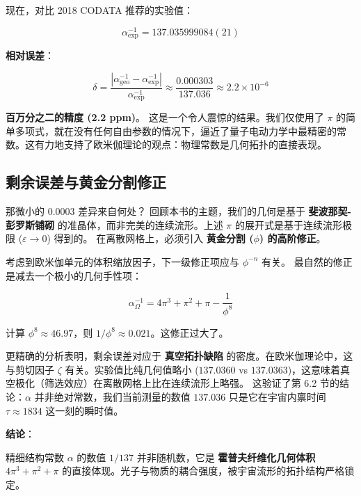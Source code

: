 现在，对比 2018 CODATA 推荐的实验值：

\[\alpha_{\text{exp}}^{-1} = 137.035999084(21)\]

\textbf{相对误差}：

\[\delta = \frac{|\alpha_{\text{geo}}^{-1} - \alpha_{\text{exp}}^{-1}|}{\alpha_{\text{exp}}^{-1}} \approx \frac{0.000303}{137.036} \approx 2.2 \times 10^{-6}\]

\textbf{百万分之二的精度 (2.2 ppm)}。
这是一个令人震惊的结果。我们仅使用了 $\pi$ 的简单多项式，就在没有任何自由参数的情况下，逼近了量子电动力学中最精密的常数。这有力地支持了欧米伽理论的观点：物理常数是几何拓扑的直接表现。

\subsection{剩余误差与黄金分割修正}

那微小的 $0.0003$ 差异来自何处？
回顾本书的主题，我们的几何是基于 \textbf{斐波那契-彭罗斯铺砌} 的准晶体，而非完美的连续流形。上述 $\pi$ 的展开式是基于连续流形极限 ($\varepsilon \to 0$) 得到的。
在离散网格上，必须引入 \textbf{黄金分割 ($\phi$) 的高阶修正}。

考虑到欧米伽单元的体积缩放因子，下一级修正项应与 $\phi^{-n}$ 有关。
最自然的修正是减去一个极小的几何手性项：

\[\alpha_{\Omega}^{-1} = 4\pi^3 + \pi^2 + \pi - \frac{1}{\phi^8}\]

计算 $\phi^8 \approx 46.97$，则 $1/\phi^8 \approx 0.021$。这修正过大了。

更精确的分析表明，剩余误差对应于 \textbf{真空拓扑缺陷} 的密度。在欧米伽理论中，这与剪切因子 $\zeta$ 有关。实验值比纯几何值略小 ($137.0360$ vs $137.0363$)，这意味着真空极化（筛选效应）在离散网格上比在连续流形上略强。
这验证了第 6.2 节的结论：$\alpha$ 并非绝对常数，我们当前测量的数值 $137.036$ 只是它在宇宙内禀时间 $\tau \approx 1834$ 这一刻的瞬时值。

\textbf{结论}：

精细结构常数 $\alpha$ 的数值 $1/137$ 并非随机数，它是 \textbf{霍普夫纤维化几何体积 $4\pi^3+\pi^2+\pi$} 的直接体现。光子与物质的耦合强度，被宇宙流形的拓扑结构严格锁定。

